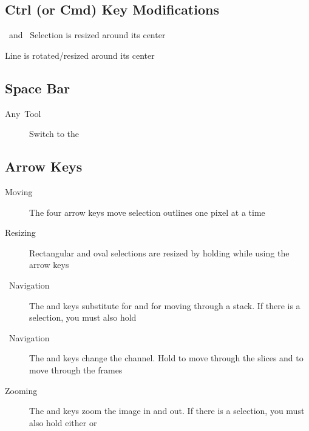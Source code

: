 

\subsection{Ctrl (or Cmd) Key Modifications}

\ and\ 
Selection is resized around its center 

 Line is rotated/resized around
its center




\subsection{Space Bar}
\begin{description}
\item [{Any\ Tool}] Switch to the 
\end{description}

\subsection{Arrow Keys\label{Arrow-Keys}}
\begin{description}
\item [{Moving\ }] The four arrow keys
move selection outlines one pixel at a time
\item [{Resizing\ }] Rectangular and oval
selections are resized by holding  while using the
arrow keys
\item [{\ Navigation}] The \mykeystroke{$\leftarrow$}
and \mykeystroke{$\rightarrow$} keys substitute for \mykeystroke{<}
and \mykeystroke{>} for moving through a stack. If there is a selection,
you must also hold 
\item [{\ Navigation}] The \mykeystroke{$\leftarrow$}
and \mykeystroke{$\rightarrow$} keys change the channel. Hold 
to move through the slices and  to move through
the frames
\item [{Zooming}] The \mykeystroke{$\uparrow$} and \mykeystroke{$\downarrow$}
keys zoom the image in and out. If there is a selection, you must
also hold either  or 
\end{description}

